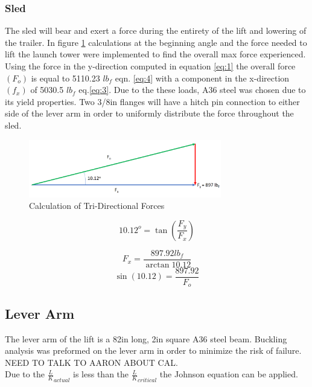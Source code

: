 \documentclass[10pt,a4paper]{article}
\begin{document}
 \subsubsection{Sled}
 The sled will bear and exert a force during the entirety of the lift and lowering of the trailer. In figure \ref{fig:forces} calculations at the beginning angle and the force needed to lift the launch tower were implemented to find the overall max force experienced. Using the force in the y-direction computed in equation \eqref{eq:1} the overall force $(F_o)$ is equal to 5110.23 $lb_f$ eqn. \ref{eq:4} with a component in the x-direction $(f_x)$ of 5030.5 $lb_f$ eq.\ref{eq:3}. Due to the these loads, A36 steel was chosen due to its yield properties. Two 3/8in flanges will have a hitch pin connection to either side of the lever arm in order to uniformly distribute the force throughout the sled.  
\begin{figure}
	\centering
	\includegraphics[width=0.75\textwidth]{./figs/forces.png}
	\caption{Calculation of Tri-Directional Forces}
	\label{fig:forces}
\end{figure}
\begin{equation}
10.12^o = \tan(\frac{F_y}{F_x})
\end{equation} 

\begin{equation}
F_x = \frac{897.92lb_f}{\arctan{10.12}}
\end{equation}
\label{eq:3}
\begin{equation}
\sin(10.12) = \frac{897.92}{F_o}
\end{equation}
\label{eq:4}



\subsection{Lever Arm}
The lever arm of the lift is a 82in long, 2in square A36 steel beam. Buckling analysis was preformed on the lever arm in order to minimize the risk of failure. NEED TO TALK TO AARON ABOUT CAL. \\

Due to the $\frac{L}{K}_{actual}$ is less than the $\frac{L}{K}_ {critical}$ the Johnson equation can be applied.  \\
\end{document}
